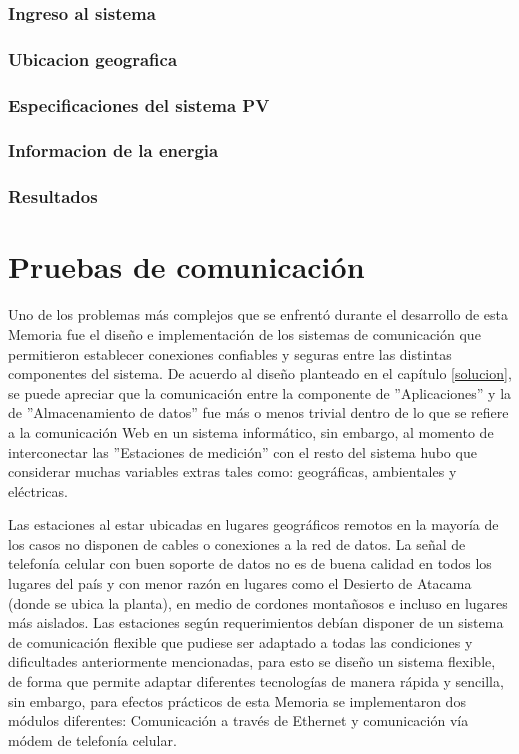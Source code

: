 \subsubsection{Ingreso al sistema}
\subsubsection{Ubicacion geografica}
\subsubsection{Especificaciones del sistema PV}
\subsubsection{Informacion de la energia}
\subsubsection{Resultados}

\section{Pruebas de comunicación}
Uno de los problemas más complejos que se enfrentó durante el desarrollo de esta Memoria fue el diseño e implementación de los sistemas de comunicación que permitieron establecer conexiones confiables y seguras entre las distintas componentes del sistema. De acuerdo al diseño planteado en el capítulo \ref{solucion}, se puede apreciar que la comunicación entre la componente de ''Aplicaciones'' y la de ''Almacenamiento de datos'' fue más o menos trivial dentro de lo que se refiere a la comunicación Web en un sistema informático, sin embargo, al momento de interconectar las ''Estaciones de medición'' con el resto del sistema hubo que considerar muchas variables extras tales como: geográficas, ambientales y eléctricas.

Las estaciones al estar ubicadas en lugares geográficos remotos en la mayoría de los casos no disponen de cables o conexiones a la red de datos. La señal de telefonía celular con buen soporte de datos no es de buena calidad en todos los lugares del país y con menor razón en lugares como el Desierto de Atacama (donde se ubica la planta), en medio de cordones montañosos e incluso en lugares más aislados. Las estaciones según requerimientos debían disponer de un sistema de comunicación flexible que pudiese ser adaptado a todas las condiciones y dificultades anteriormente mencionadas, para esto se diseño un sistema flexible, de forma que permite adaptar diferentes tecnologías de manera rápida y sencilla, sin embargo, para efectos prácticos de esta Memoria se implementaron dos módulos diferentes: Comunicación a través de Ethernet y comunicación vía módem de telefonía celular.

